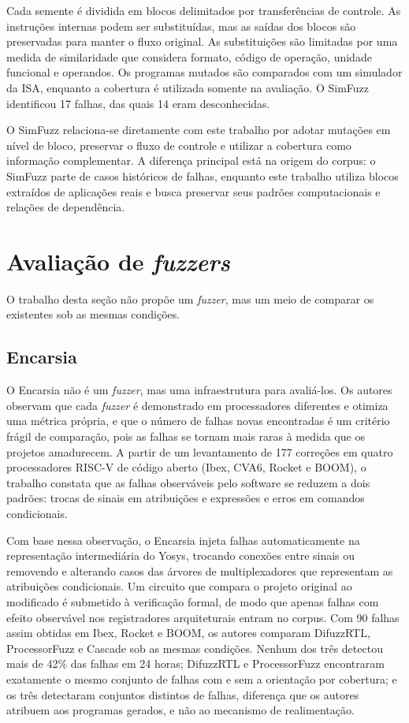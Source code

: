 Cada semente é dividida em blocos delimitados por transferências de controle. As instruções internas podem ser substituídas, mas as saídas dos blocos são preservadas para manter o fluxo original. As substituições são limitadas por uma medida de similaridade que considera formato, código de operação, unidade funcional e operandos. Os programas mutados são comparados com um simulador da ISA, enquanto a cobertura é utilizada somente na avaliação. O SimFuzz identificou 17 falhas, das quais 14 eram desconhecidas.

O SimFuzz relaciona-se diretamente com este trabalho por adotar mutações em nível de bloco, preservar o fluxo de controle e utilizar a cobertura como informação complementar. A diferença principal está na origem do corpus: o SimFuzz parte de casos históricos de falhas, enquanto este trabalho utiliza blocos extraídos de aplicações reais e busca preservar seus padrões computacionais e relações de dependência.

\section{Avaliação de \textit{fuzzers}}\label{sec:rel-avaliacao}

O trabalho desta seção não propõe um \textit{fuzzer}, mas um meio de comparar os existentes sob as mesmas condições.

\subsection{Encarsia}\label{sec:encarsia}

O Encarsia \citep{Bolcskei:2025:Encarsia} não é um \textit{fuzzer}, mas uma infraestrutura para avaliá-los. Os autores observam que cada \textit{fuzzer} é demonstrado em processadores diferentes e otimiza uma métrica própria, e que o número de falhas novas encontradas é um critério frágil de comparação, pois as falhas se tornam mais raras à medida que os projetos amadurecem. A partir de um levantamento de 177 correções em quatro processadores RISC-V de código aberto (Ibex, CVA6, Rocket e BOOM), o trabalho constata que as falhas observáveis pelo software se reduzem a dois padrões: trocas de sinais em atribuições e expressões e erros em comandos condicionais.

Com base nessa observação, o Encarsia injeta falhas automaticamente na representação intermediária do Yosys, trocando conexões entre sinais ou removendo e alterando casos das árvores de multiplexadores que representam as atribuições condicionais. Um circuito que compara o projeto original ao modificado é submetido à verificação formal, de modo que apenas falhas com efeito observável nos registradores arquiteturais entram no corpus. Com 90 falhas assim obtidas em Ibex, Rocket e BOOM, os autores comparam DifuzzRTL, ProcessorFuzz e Cascade sob as mesmas condições. Nenhum dos três detectou mais de 42\% das falhas em 24 horas; DifuzzRTL e ProcessorFuzz encontraram exatamente o mesmo conjunto de falhas com e sem a orientação por cobertura; e os três detectaram conjuntos distintos de falhas, diferença que os autores atribuem aos programas gerados, e não ao mecanismo de realimentação.

